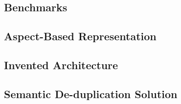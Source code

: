 \subsection{Benchmarks}


\subsection{Aspect-Based Representation}


\subsection{Invented Architecture}


\subsection{Semantic De-duplication Solution}

